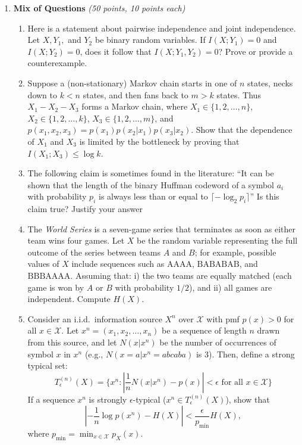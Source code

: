 \documentclass[12pt]{article}
\begin{document}
\begin{enumerate}
\item  {\bf Mix of Questions} {\it (50 points, 10 points each)}
\begin{enumerate}[1)]
\item Here is a statement about pairwise independence and joint independence. Let $X, Y_1,$ and $Y_2$ be binary random variables. If $I(X;Y_1)=0$ and $I(X;Y_2)=0$, does it follow that $I(X;Y_1, Y_2)=0$? Prove or provide a counterexample.


\item  Suppose a (non-stationary) Markov chain starts in one of $n$ states, necks down to $k < n$ states,
and then fans back to $m > k$ states.
Thus $X_1 - X_2 - X_3$ forms a Markov chain, where $X_1 \in \{1,2,\ldots, n\}$, $X_2 \in  \{1,2,\ldots, k\}$, $X_3 \in \{1,2,\ldots, m\}$,
and $p(x_1,x_2,x_3)  = p(x_1)p(x_2|x_1)p(x_3|x_2)$.
Show that the dependence of $X_1$ and $X_3$ is limited by the bottleneck by proving that $ I(X_1 ;X_3) \leq \log k.$

\item The following claim is sometimes found in the literature: 
``It can be shown that the length of the binary Huﬀman codeword of a symbol $a_i$ with
probability $p_i$ is always less than or equal to $\lceil -\log_2 p_i\rceil$''
Is this claim true? Justify your answer 

\item The \emph{World Series} is a seven-game series that terminates as soon as either team wins four games.  
Let \(X\) be the random variable representing the full outcome of the series between teams \(A\) and \(B\);  
for example, possible values of \(X\) include sequences such as \(\text{AAAA}\), \(\text{BABABAB}\), and \(\text{BBBAAAA}\).  
Assuming that: i) the two teams are equally matched (each game is won by \(A\) or \(B\) with probability \(1/2\)), and
    ii) all games are independent. Compute $H(X)$.

\item Consider an i.i.d.\ information source $X^n$ over $\mathcal{X}$ with pmf $p(x)>0$ for all $x \in \mathcal{X}$. 
Let $x^n = (x_1, x_2, \dots, x_n)$ be a sequence of length $n$ drawn from this source, 
and
let $N(x|x^n)$ be the number of occurrences of symbol $x$ in $x^n$ (e.g., $N(x=a|x^n=abcaba)$ is 3).
Then, define a strong typical set:
\[
T_{\epsilon}^{(n)}(X) = \{x^n : \left| \frac{1}{n} N(x|x^n) - p(x) \right| < \epsilon \mbox{ for all $x\in\mathcal{X}$}\}
\]
If a sequence $x^n$ is strongly $\epsilon$-typical ($x^n \in T_\epsilon^{(n)}(X)$), show that
\[
\left| -\frac{1}{n} \log p(x^n) - H(X) \right| < \frac{\epsilon}{p_{\min}} H(X),
\]
where $p_{\min} = \min_{x\in\mathcal{X}} p_X(x)$.


\end{enumerate}
\end{enumerate}
\end{document}
